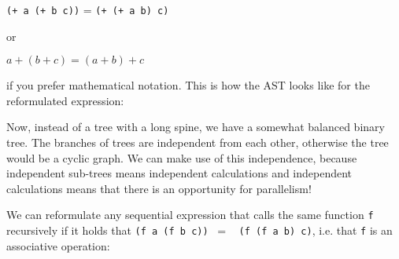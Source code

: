 \documentclass{article}
\begin{document}
\begin{center}
  \lstinline{(+ a (+ b c))} = \lstinline{(+ (+ a b) c)}
\end{center}

or

\begin{center}
  $a + (b + c) = (a + b) + c$
\end{center}

if you prefer mathematical notation. This is how the AST looks like for the reformulated expression:

\begin{center}
\end{center}

Now, instead of a tree with a long spine, we have a somewhat balanced binary tree. The branches of trees are independent from each other, otherwise the tree would be a cyclic graph. We can make use of this independence, because independent sub-trees means independent calculations and independent calculations means that there is an opportunity for parallelism!

We can reformulate any sequential expression that calls the same function \lstinline{f} recursively if it holds that \lstinline{(f a (f b c))}~ = ~ \lstinline{(f (f a b) c)}, i.e. that \lstinline{f} is an associative operation:

\begin{center}
\end{center}
\end{document}

